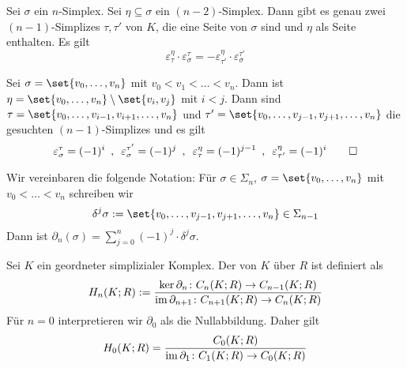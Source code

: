 \begin{lemma}[label=lem:38,{name=[{Ein $(n-2)$-Simplex ist Seite von genau zwei $(n-1)$-Simplizes}]}]
	Sei $\sigma$ ein $n$-Simplex. Sei $\eta \subseteq \sigma$ ein $(n-2)$-Simplex. Dann gibt es genau zwei $(n-1)$-Simplizes $\tau, \tau'$ von $K$, die eine Seite von $\sigma$
	sind und $\eta$ als Seite enthalten. Es gilt
	\[
		\varepsilon_\tau^\eta \cdot \varepsilon^\tau_\sigma = - \varepsilon_{\tau'}^\eta \cdot \varepsilon^{\tau'}_\sigma
	\]
\end{lemma}
\begin{beweis}
	Sei $\sigma= \set{v_0, \ldots ,v_n}$ mit $v_0 < v_1 < \ldots < v_n$. 
	Dann ist $\eta = \set{v_0, \ldots , v_n} \setminus \set{v_i, v_j}$ mit $i<j$. 
	Dann sind $\tau = \set{v_0, \ldots , v_{i-1}, v_{i+1}, \ldots , v_n}$ und $\tau' = \set{v_0, \ldots , v_{j-1}, v_{j+1}, \ldots , v_n}$ die gesuchten $(n-1)$-Simplizes und es gilt
	\[
		\varepsilon_\sigma^\tau = (-1)^i \enspace, \enspace \varepsilon_\sigma^{\tau'} = (-1)^j \enspace, \enspace \varepsilon^\eta_\tau = (-1)^{j-1} \enspace, \enspace 
		\varepsilon_{\tau'}^\eta = (-1)^i \qedhere
	\]
\end{beweis}

Wir vereinbaren die folgende Notation: Für $\sigma \in \Sigma_n$, $ \sigma= \set{v_0, \ldots ,v_n} $ mit $v_0 < \ldots < v_n$ schreiben wir 
\[
	\delta^j \sigma := \set{v_0 , \ldots , v_{j-1}, v_{j+1}, \ldots , v_n}  \in \Sigma_{n-1}
\]
Dann ist $\partial_n(\sigma) = \sum_{j=0}^{n} (-1)^j \cdot \delta^j \sigma$.

\begin{definition}[{name=[{$n$-ter Homologiemodul}]}]
	Sei $K$ ein geordneter simplizialer Komplex. Der  von 
	$K$ über $R$ ist definiert als
	\[
		H_n(K;R) := \frac{\ker \partial_n \colon C_n(K;R) \to C_{n-1}(K;R)}{\operatorname{im} \partial_{n+1} \colon C_{n+1}(K;R) \to C_n(K;R)} 
	\]
	Für $n=0$ interpretieren wir $\partial_0$ als die Nullabbildung. Daher gilt 
	\[
		H_0(K;R) = \frac{C_0(K;R)}{\operatorname{im} \partial_1 \colon C_1(K;R) \to C_0(K;R)} 
	\]
\end{definition}

